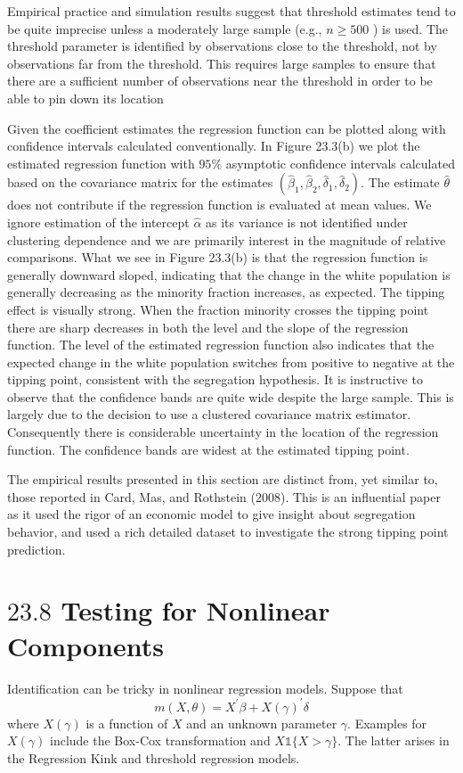 \documentclass[10pt]{article}
\begin{document}
Empirical practice and simulation results suggest that threshold estimates tend to be quite imprecise unless a moderately large sample (e.g., $n \geq 500$ ) is used. The threshold parameter is identified by observations close to the threshold, not by observations far from the threshold. This requires large samples to ensure that there are a sufficient number of observations near the threshold in order to be able to pin down its location

Given the coefficient estimates the regression function can be plotted along with confidence intervals calculated conventionally. In Figure 23.3(b) we plot the estimated regression function with $95 \%$ asymptotic confidence intervals calculated based on the covariance matrix for the estimates $\left(\widehat{\beta}_{1}, \widehat{\beta}_{2}, \widehat{\delta}_{1}, \widehat{\delta}_{2}\right)$. The estimate $\widehat{\theta}$ does not contribute if the regression function is evaluated at mean values. We ignore estimation of the intercept $\widehat{\alpha}$ as its variance is not identified under clustering dependence and we are primarily interest in the magnitude of relative comparisons. What we see in Figure 23.3(b) is that the regression function is generally downward sloped, indicating that the change in the white population is generally decreasing as the minority fraction increases, as expected. The tipping effect is visually strong. When the fraction minority crosses the tipping point there are sharp decreases in both the level and the slope of the regression function. The level of the estimated regression function also indicates that the expected change in the white population switches from positive to negative at the tipping point, consistent with the segregation hypothesis. It is instructive to observe that the confidence bands are quite wide despite the large sample. This is largely due to the decision to use a clustered covariance matrix estimator. Consequently there is considerable uncertainty in the location of the regression function. The confidence bands are widest at the estimated tipping point.

The empirical results presented in this section are distinct from, yet similar to, those reported in Card, Mas, and Rothstein (2008). This is an influential paper as it used the rigor of an economic model to give insight about segregation behavior, and used a rich detailed dataset to investigate the strong tipping point prediction.

\section{$23.8$ Testing for Nonlinear Components}
Identification can be tricky in nonlinear regression models. Suppose that
$$
m(X, \theta)=X^{\prime} \beta+X(\gamma)^{\prime} \delta
$$
where $X(\gamma)$ is a function of $X$ and an unknown parameter $\gamma$. Examples for $X(\gamma)$ include the Box-Cox transformation and $X \mathbb{1}\{X>\gamma\}$. The latter arises in the Regression Kink and threshold regression models.
\end{document}
